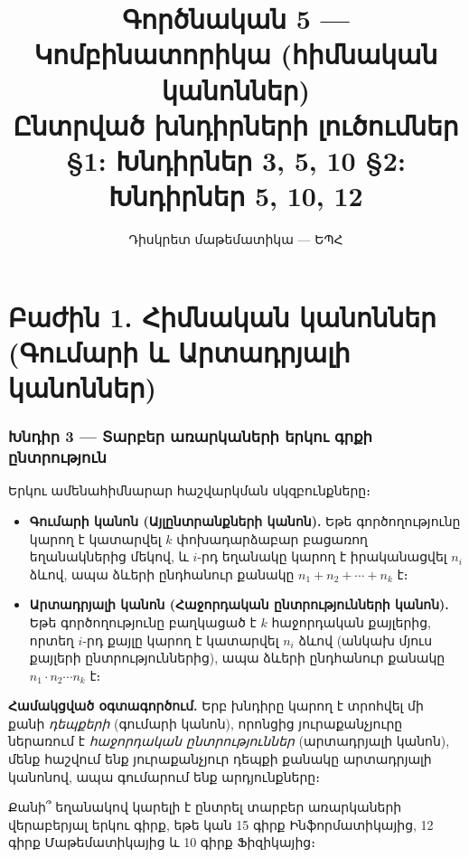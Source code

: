 \documentclass[12pt, a4paper]{article}
\title{\textbf{Գործնական 5 — Կոմբինատորիկա (հիմնական կանոններ)}\\[4pt]
       \large Ընտրված խնդիրների լուծումներ\\[2pt]
       \normalsize \S1: Խնդիրներ 3, 5, 10 \quad \S2: Խնդիրներ 5, 10, 12}
\author{Դիսկրետ մաթեմատիկա — ԵՊՀ}
\date{}
\begin{document}
\maketitle
\tableofcontents
\newpage

\part*{Բաժին 1. Հիմնական կանոններ (Գումարի և Արտադրյալի կանոններ)}

\section{Խնդիր 3 — Տարբեր առարկաների երկու գրքի ընտրություն}

\begin{theorybox}
Երկու ամենահիմնարար հաշվարկման սկզբունքները։

\begin{itemize}[nosep]
  \item \textbf{Գումարի կանոն (Այլընտրանքների կանոն).}
    Եթե գործողությունը կարող է կատարվել $k$ փոխադարձաբար բացառող եղանակներից մեկով,
    և $i$-րդ եղանակը կարող է իրականացվել $n_i$ ձևով, ապա ձևերի ընդհանուր քանակը
    $n_1 + n_2 + \cdots + n_k$ է։

  \item \textbf{Արտադրյալի կանոն (Հաջորդական ընտրությունների կանոն).}
    Եթե գործողությունը բաղկացած է $k$ հաջորդական քայլերից, որտեղ $i$-րդ քայլը կարող է
    կատարվել $n_i$ ձևով (անկախ մյուս քայլերի ընտրություններից),
    ապա ձևերի ընդհանուր քանակը $n_1 \cdot n_2 \cdots n_k$ է։
\end{itemize}

\medskip
\textbf{Համակցված օգտագործում.}\;
Երբ խնդիրը կարող է տրոհվել մի քանի \emph{դեպքերի} (գումարի կանոն),
որոնցից յուրաքանչյուրը ներառում է \emph{հաջորդական ընտրություններ} (արտադրյալի կանոն),
մենք հաշվում ենք յուրաքանչյուր դեպքի քանակը արտադրյալի կանոնով, ապա գումարում ենք արդյունքները։
\end{theorybox}

\begin{problembox}
Քանի՞ եղանակով կարելի է ընտրել տարբեր առարկաների վերաբերյալ երկու գիրք,
եթե կան 15 գիրք Ինֆորմատիկայից, 12 գիրք Մաթեմատիկայից և 10 գիրք Ֆիզիկայից։
\end{problembox}
\end{document}
